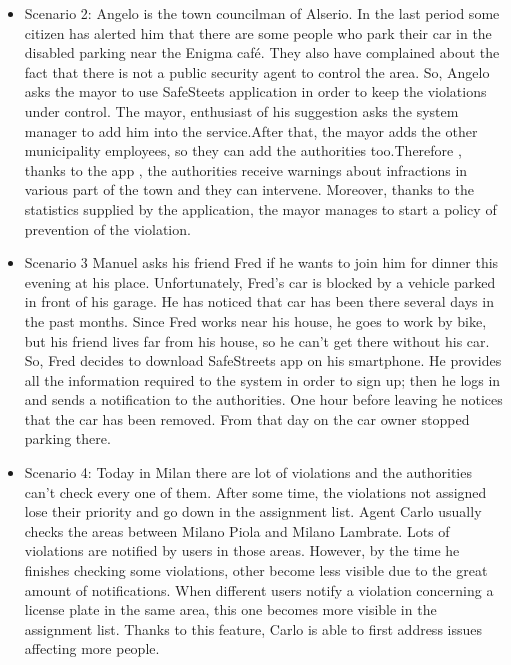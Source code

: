 \begin{itemize}
\item Scenario 2:
\newline
Angelo is the town councilman of Alserio. In the last period some citizen has alerted him that there are some people who park their car in the disabled parking near the Enigma café. They also have complained about the fact that there is not a public security agent to control the area. So, Angelo asks the mayor to use SafeSteets application in order to keep the violations under control. The mayor, enthusiast of his suggestion asks the system manager to add him into the service.After that, the mayor adds the other municipality employees, so they can add the authorities too.Therefore , thanks to the app , the authorities receive warnings about infractions in various part of the town and they can intervene. Moreover, thanks to the statistics supplied by the application, the mayor manages to start a policy of prevention of the violation.
\item Scenario 3
\newline
Manuel asks his friend Fred if he wants to join him for dinner this evening at his place. Unfortunately, Fred's car is blocked by a vehicle parked in front of his garage. He has noticed that car has been there several days in the past months. Since Fred works near his house, he goes to work by bike, but his friend lives far from his house, so he can't get there without his car. So, Fred decides to download SafeStreets app on his smartphone. He provides all the information required to the system in order to sign up; then he logs in and sends a notification to the authorities. One hour before leaving he notices that the car has been removed. From that day on the car owner stopped parking there.
\item Scenario 4:
\newline
Today in Milan there are lot of violations and the authorities can't check every one of them. After some time, the violations not assigned lose their priority and go down in the assignment list. Agent Carlo usually checks the areas between Milano Piola and Milano Lambrate. Lots of violations are notified by users in those areas. However, by the time he finishes checking some violations, other become less visible due to the great amount of notifications. When different users notify a violation concerning a license plate in the same area, this one becomes more visible in the assignment list. Thanks to this feature, Carlo is able to first address issues affecting more people.


\end{itemize}

